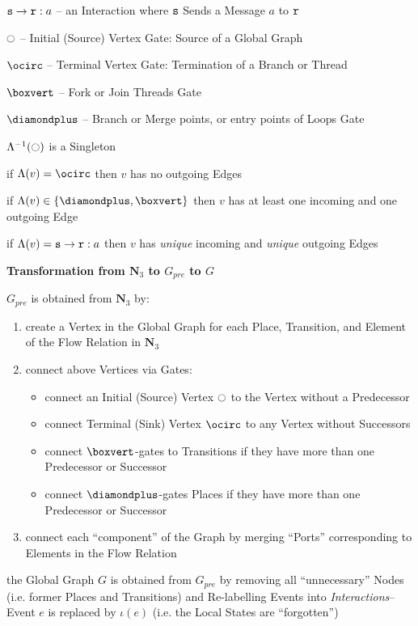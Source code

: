 $\mathtt{s}\rightarrow\mathtt{r}:a$ -- an Interaction where $\mathtt{s}$
Sends a Message $a$ to $\mathtt{r}$

$\ocircle$ -- Initial (Source) Vertex Gate: Source of a Global Graph

$\ocirc$ -- Terminal Vertex Gate: Termination of a Branch or Thread

$\boxvert$ -- Fork or Join Threads Gate

$\diamondplus$ -- Branch or Merge points, or entry points of Loops
Gate

$\Lambda^{-1}(\ocircle)$ is a Singleton

if $\Lambda(v) = \ocirc$ then $v$ has no outgoing Edges

if $\Lambda(v) \in \{\diamondplus, \boxvert\}$ then $v$ has at least
one incoming and one outgoing Edge

if $\Lambda(v) = \mathtt{s}\rightarrow\mathtt{r}:a$ then $v$ has
\emph{unique} incoming and \emph{unique} outgoing Edges


\textbf{Transformation from $\mathbf{N}_3$ to $G_{pre}$ to $G$}

$G_{pre}$ is obtained from $\mathbf{N}_3$ by:
\begin{enumerate}
  \item create a Vertex in the Global Graph for each Place,
    Transition, and Element of the Flow Relation in $\mathbf{N}_3$
  \item connect above Vertices via Gates:
    \begin{itemize}
      \item connect an Initial (Source) Vertex $\ocircle$ to the
        Vertex without a Predecessor
      \item connect Terminal (Sink) Vertex $\ocirc$ to any Vertex
        without Successors
      \item connect $\boxvert$-gates to Transitions if they have more
        than one Predecessor or Successor
      \item connect $\diamondplus$-gates Places if they have more than
        one Predecessor or Successor
    \end{itemize}
  \item connect each ``component'' of the Graph by merging ``Ports''
    corresponding to Elements in the Flow Relation %
\end{enumerate}

the Global Graph $G$ is obtained from $G_{pre}$ by removing all
``unnecessary'' Nodes (i.e. former Places and Transitions) and
Re-labelling Events into \emph{Interactions}-- Event $e$ is replaced
by $\iota(e)$ (i.e. the Local States are ``forgotten'')


